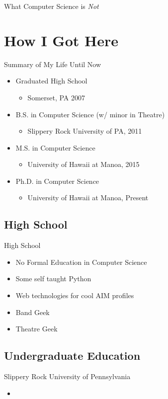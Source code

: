\documentclass{beamer}
\begin{document}
\begin{frame}{What Computer Science is \emph{Not}}

\end{frame}

\section{How I Got Here}
\begin{frame}{Summary of My Life Until Now}
\begin{itemize}
	\item Graduated High School
	\begin{itemize}
		\item Somerset, PA 2007
	\end{itemize}
	\item B.S. in Computer Science (w/ minor in Theatre)
	\begin{itemize}
		\item Slippery Rock University of PA, 2011
	\end{itemize}
	\item M.S. in Computer Science
	\begin{itemize}
		\item University of Hawaii at Manoa, 2015
	\end{itemize}
	\item Ph.D. in Computer Science
	\begin{itemize}
		\item University of Hawaii at Manoa, Present
	\end{itemize}
\end{itemize}
\end{frame}

\subsection{High School}
\begin{frame}{High School}
\begin{itemize}
	\item No Formal Education in Computer Science
	\item Some self taught Python
	\item Web technologies for cool AIM profiles
	\item Band Geek
	\item Theatre Geek
\end{itemize}
\end{frame}

\subsection{Undergraduate Education}
\begin{frame}{Slippery Rock University of Pennsylvania}
\begin{itemize}
	\item 
\end{itemize}
\end{frame}
\end{document}
